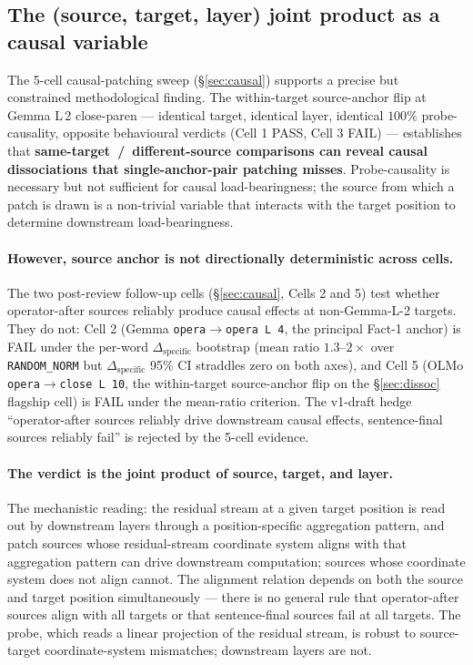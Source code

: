 \documentclass[11pt,letterpaper]{article}
\newcommand{\dspec}{\ensuremath{\Delta_{\text{specific}}}}
\begin{document}
\subsection{The (source, target, layer) joint product as a causal variable}
\label{sec:joint}

The 5-cell causal-patching sweep (\S\ref{sec:causal}) supports a
precise but constrained methodological finding. The within-target
source-anchor flip at Gemma L\,2 close-paren --- identical target,
identical layer, identical $100\%$ probe-causality, opposite
behavioural verdicts (Cell 1 PASS, Cell 3 FAIL) --- establishes that
\textbf{same-target~/~different-source comparisons can reveal causal
dissociations that single-anchor-pair patching misses}.
Probe-causality is necessary but not sufficient for causal
load-bearingness; the source from which a patch is drawn is a
non-trivial variable that interacts with the target position to
determine downstream load-bearingness.

\paragraph{However, source anchor is not directionally deterministic
across cells.} The two post-review follow-up cells
(\S\ref{sec:causal}, Cells 2 and 5) test whether operator-after
sources reliably produce causal effects at non-Gemma-L-2 targets.
They do not: Cell 2 (Gemma \texttt{opera$\to$opera L\,4}, the
principal Fact-1 anchor) is FAIL under the per-word \dspec{}
bootstrap (mean ratio $1.3$--$2\times$ over \texttt{RANDOM\_NORM} but
\dspec{} 95\% CI straddles zero on both axes), and Cell 5 (OLMo
\texttt{opera$\to$close L\,10}, the within-target source-anchor flip
on the \S\ref{sec:dissoc} flagship cell) is FAIL under the
mean-ratio criterion. The
v1-draft hedge ``operator-after sources reliably drive downstream
causal effects, sentence-final sources reliably fail'' is rejected
by the 5-cell evidence.

\paragraph{The verdict is the joint product of source, target, and
layer.} The mechanistic reading: the residual stream at a given
target position is read out by downstream layers through a
position-specific aggregation pattern, and patch sources whose
residual-stream coordinate system aligns with that aggregation
pattern can drive downstream computation; sources whose coordinate
system does not align cannot. The alignment relation depends on both
the source and target position simultaneously --- there is no
general rule that operator-after sources align with all targets or
that sentence-final sources fail at all targets. The probe, which
reads a linear projection of the residual stream, is robust to
source-target coordinate-system mismatches; downstream layers are
not.
\end{document}

